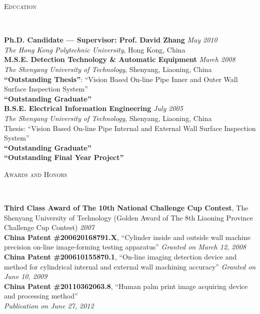 \documentclass[9pt]{article}
\newenvironment{changemargin}[2]{%
  \begin{list}{}{%
    \setlength{\topsep}{0pt}%
    \setlength{\leftmargin}{#1}%
    \setlength{\rightmargin}{#2}%
    \setlength{\listparindent}{\parindent}%
    \setlength{\itemindent}{\parindent}%
    \setlength{\parsep}{\parskip}%
  }%
  \item[]}{\end{list}
}
\newcommand{\lineover}{
	\begin{changemargin}{-0.05in}{-0.05in}
		\vspace*{-8pt}
		\hrulefill \\
		\vspace*{-2pt}
	\end{changemargin}
}
\newcommand{\header}[1]{
	\begin{changemargin}{-0.5in}{-0.5in}
		\scshape{#1}\\
  	\lineover
	\end{changemargin}
}
\newenvironment{body} {
	\vspace*{-16pt}
	\begin{changemargin}{-0.25in}{-0.5in}
  }	
	{\end{changemargin}
}
\begin{document}
\medskip


\header{Education}

\begin{body}
	\vspace{14pt}
	\textbf{Ph.D. Candidate --- Supervisor: Prof. David Zhang}{} \hfill \emph{May 2010}{} \\
	\emph{The Hong Kong Polytechnic University}, Hong Kong, China{} \\
  \medskip
	\textbf{M.S.E. Detection Technology \& Automatic Equipment}{} \hfill \emph{March 2008}{} \\
	\emph{The Shenyang University of Technology}, Shenyang, Liaoning, China{} \\
	\textbf{``Outstanding Thesis''}: ``Vision Based On-line Pipe Inner and Outer Wall Surface Inspection System''\\
    \textbf{``Outstanding Graduate''}\\
  \medskip
	\textbf{B.S.E. Electrical Information Engineering} \hfill \emph{July 2005} \\
    \emph{The Shenyang University of Technology}, Shenyang, Liaoning, China{} \\
    Thesis: ``Vision Based On-line Pipe Internal and External Wall Surface Inspection System''\\
    \textbf{``Outstanding Graduate''}\\
    \textbf{``Outstanding Final Year Project''}\\
\end{body}

\medskip


\header{Awards and Honors}

\begin{body}
	\vspace{14pt}
	\textbf{Third Class Award of The 10th National Challenge Cup Contest}, The Shenyang University of Technology (Golden Award of The 8th Liaoning Province Challenge Cup Contest)  \hfill{} \emph{2007}\\
	\medskip
    \textbf{China Patent \#200620168791.X}, ``Cylinder inside and outside wall machine precision on-line image-forming testing apparatus'' \hfill{} \emph{Granted on March 12, 2008} \\ 
    \medskip
	\textbf{China Patent \#200610155870.1}, ``On-line imaging detection device and method for cylindrical internal and external wall machining accuracy'' \hfill{} \emph{Granted on June 10, 2009} \\ 
	\medskip
    \textbf{China Patent \#20110362063.8}, ``Human palm print image acquiring device and processing method'' \\ \hfill{} \emph{Publication on June 27, 2012}
\end{body}
\end{document}

